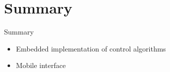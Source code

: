 \documentclass{beamer}
\begin{document}
\section*{Summary}
\begin{frame}{Summary} %
  \begin{itemize}
    \item Embedded implementation of control algorithms
    \item Mobile interface
  \end{itemize}
  
\end{frame}
  
\end{document}
